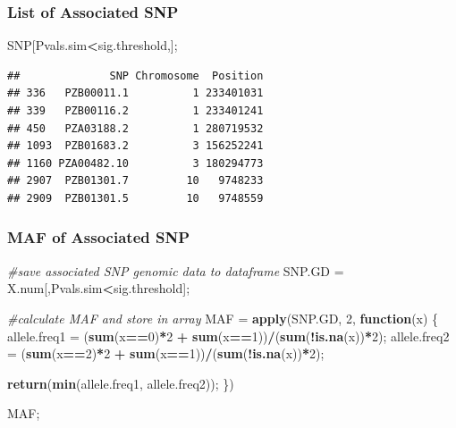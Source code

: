 \documentclass[
]{article}
\newenvironment{Shaded}{\begin{snugshade}}{\end{snugshade}}
\newcommand{\CommentTok}[1]{\textcolor[rgb]{0.56,0.35,0.01}{\textit{#1}}}
\newcommand{\ControlFlowTok}[1]{\textcolor[rgb]{0.13,0.29,0.53}{\textbf{#1}}}
\newcommand{\DecValTok}[1]{\textcolor[rgb]{0.00,0.00,0.81}{#1}}
\newcommand{\KeywordTok}[1]{\textcolor[rgb]{0.13,0.29,0.53}{\textbf{#1}}}
\newcommand{\NormalTok}[1]{#1}
\newcommand{\OperatorTok}[1]{\textcolor[rgb]{0.81,0.36,0.00}{\textbf{#1}}}
\newcommand{\StringTok}[1]{\textcolor[rgb]{0.31,0.60,0.02}{#1}}
\begin{document}
\hypertarget{list-of-associated-snp-1}{%
\subsubsection{List of Associated SNP}\label{list-of-associated-snp-1}}

\begin{Shaded}
\begin{Highlighting}[]
\NormalTok{SNP[Pvals.sim}\OperatorTok{\textless{}}\NormalTok{sig.threshold,];}
\end{Highlighting}
\end{Shaded}

\begin{verbatim}
##              SNP Chromosome  Position
## 336   PZB00011.1          1 233401031
## 339   PZB00116.2          1 233401241
## 450   PZA03188.2          1 280719532
## 1093  PZB01683.2          3 156252241
## 1160 PZA00482.10          3 180294773
## 2907  PZB01301.7         10   9748233
## 2909  PZB01301.5         10   9748559
\end{verbatim}

\hypertarget{maf-of-associated-snp-1}{%
\subsubsection{MAF of Associated SNP}\label{maf-of-associated-snp-1}}

\begin{Shaded}
\begin{Highlighting}[]
\CommentTok{\#save associated SNP genomic data to dataframe}
\NormalTok{SNP.GD =}\StringTok{ }\NormalTok{X.num[,Pvals.sim}\OperatorTok{\textless{}}\NormalTok{sig.threshold];}

\CommentTok{\#calculate MAF and store in array}
\NormalTok{MAF =}\StringTok{ }\KeywordTok{apply}\NormalTok{(SNP.GD, }\DecValTok{2}\NormalTok{, }\ControlFlowTok{function}\NormalTok{(x)}
\NormalTok{  \{}
\NormalTok{  allele.freq1 =}\StringTok{ }\NormalTok{(}\KeywordTok{sum}\NormalTok{(x}\OperatorTok{==}\DecValTok{0}\NormalTok{)}\OperatorTok{*}\DecValTok{2} \OperatorTok{+}\StringTok{ }\KeywordTok{sum}\NormalTok{(x}\OperatorTok{==}\DecValTok{1}\NormalTok{))}\OperatorTok{/}\NormalTok{(}\KeywordTok{sum}\NormalTok{(}\OperatorTok{!}\KeywordTok{is.na}\NormalTok{(x))}\OperatorTok{*}\DecValTok{2}\NormalTok{);}
\NormalTok{  allele.freq2 =}\StringTok{ }\NormalTok{(}\KeywordTok{sum}\NormalTok{(x}\OperatorTok{==}\DecValTok{2}\NormalTok{)}\OperatorTok{*}\DecValTok{2} \OperatorTok{+}\StringTok{ }\KeywordTok{sum}\NormalTok{(x}\OperatorTok{==}\DecValTok{1}\NormalTok{))}\OperatorTok{/}\NormalTok{(}\KeywordTok{sum}\NormalTok{(}\OperatorTok{!}\KeywordTok{is.na}\NormalTok{(x))}\OperatorTok{*}\DecValTok{2}\NormalTok{);}
  
  \KeywordTok{return}\NormalTok{(}\KeywordTok{min}\NormalTok{(allele.freq1, allele.freq2));}
\NormalTok{  \})}

\NormalTok{MAF;}
\end{Highlighting}
\end{Shaded}
\end{document}

